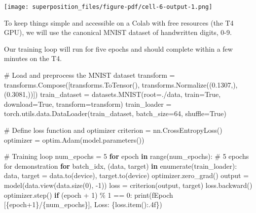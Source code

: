 \documentclass[
  letterpaper,
  DIV=11,
  numbers=noendperiod]{scrreprt}
\newenvironment{Shaded}{\begin{snugshade}}{\end{snugshade}}
\newcommand{\BuiltInTok}[1]{\textcolor[rgb]{0.00,0.23,0.31}{#1}}
\newcommand{\CommentTok}[1]{\textcolor[rgb]{0.37,0.37,0.37}{#1}}
\newcommand{\ControlFlowTok}[1]{\textcolor[rgb]{0.00,0.23,0.31}{\textbf{#1}}}
\newcommand{\DecValTok}[1]{\textcolor[rgb]{0.68,0.00,0.00}{#1}}
\newcommand{\FloatTok}[1]{\textcolor[rgb]{0.68,0.00,0.00}{#1}}
\newcommand{\KeywordTok}[1]{\textcolor[rgb]{0.00,0.23,0.31}{\textbf{#1}}}
\newcommand{\NormalTok}[1]{\textcolor[rgb]{0.00,0.23,0.31}{#1}}
\newcommand{\OperatorTok}[1]{\textcolor[rgb]{0.37,0.37,0.37}{#1}}
\newcommand{\SpecialCharTok}[1]{\textcolor[rgb]{0.37,0.37,0.37}{#1}}
\newcommand{\SpecialStringTok}[1]{\textcolor[rgb]{0.13,0.47,0.30}{#1}}
\newcommand{\StringTok}[1]{\textcolor[rgb]{0.13,0.47,0.30}{#1}}
\newcommand{\VariableTok}[1]{\textcolor[rgb]{0.07,0.07,0.07}{#1}}
\begin{document}
\texttt{[image: superposition\_files/figure-pdf/cell-6-output-1.png]}

To keep things simple and accessible on a Colab with free resources (the
T4 GPU), we will use the canonical MNIST dataset of handwritten digits,
0-9.

Our training loop will run for five epochs and should complete within a
few minutes on the T4.

\begin{Shaded}
\begin{Highlighting}[]
\CommentTok{\# Load and preprocess the MNIST dataset}
\NormalTok{transform }\OperatorTok{=}\NormalTok{ transforms.Compose([transforms.ToTensor(), transforms.Normalize((}\FloatTok{0.1307}\NormalTok{,), (}\FloatTok{0.3081}\NormalTok{,))])}
\NormalTok{train\_dataset }\OperatorTok{=}\NormalTok{ datasets.MNIST(root}\OperatorTok{=}\StringTok{\textquotesingle{}./data\textquotesingle{}}\NormalTok{, train}\OperatorTok{=}\VariableTok{True}\NormalTok{, download}\OperatorTok{=}\VariableTok{True}\NormalTok{, transform}\OperatorTok{=}\NormalTok{transform)}
\NormalTok{train\_loader }\OperatorTok{=}\NormalTok{ torch.utils.data.DataLoader(train\_dataset, batch\_size}\OperatorTok{=}\DecValTok{64}\NormalTok{, shuffle}\OperatorTok{=}\VariableTok{True}\NormalTok{)}

\CommentTok{\# Define loss function and optimizer}
\NormalTok{criterion }\OperatorTok{=}\NormalTok{ nn.CrossEntropyLoss()}
\NormalTok{optimizer }\OperatorTok{=}\NormalTok{ optim.Adam(model.parameters())}

\CommentTok{\# Training loop}
\NormalTok{num\_epochs }\OperatorTok{=} \DecValTok{5}
\ControlFlowTok{for}\NormalTok{ epoch }\KeywordTok{in} \BuiltInTok{range}\NormalTok{(num\_epochs):  }\CommentTok{\# 5 epochs for demonstration}
    \ControlFlowTok{for}\NormalTok{ batch\_idx, (data, target) }\KeywordTok{in} \BuiltInTok{enumerate}\NormalTok{(train\_loader):}
\NormalTok{        data, target }\OperatorTok{=}\NormalTok{ data.to(device), target.to(device)}
\NormalTok{        optimizer.zero\_grad()}
\NormalTok{        output }\OperatorTok{=}\NormalTok{ model(data.view(data.size(}\DecValTok{0}\NormalTok{), }\OperatorTok{{-}}\DecValTok{1}\NormalTok{))}
\NormalTok{        loss }\OperatorTok{=}\NormalTok{ criterion(output, target)}
\NormalTok{        loss.backward()}
\NormalTok{        optimizer.step()}
    \ControlFlowTok{if}\NormalTok{ (epoch }\OperatorTok{+} \DecValTok{1}\NormalTok{) }\OperatorTok{\%} \DecValTok{1} \OperatorTok{==} \DecValTok{0}\NormalTok{:}
            \BuiltInTok{print}\NormalTok{(}\SpecialStringTok{f\textquotesingle{}Epoch [}\SpecialCharTok{\{}\NormalTok{epoch}\OperatorTok{+}\DecValTok{1}\SpecialCharTok{\}}\SpecialStringTok{/}\SpecialCharTok{\{}\NormalTok{num\_epochs}\SpecialCharTok{\}}\SpecialStringTok{], Loss: }\SpecialCharTok{\{}\NormalTok{loss}\SpecialCharTok{.}\NormalTok{item()}\SpecialCharTok{:.4f\}}\SpecialStringTok{\textquotesingle{}}\NormalTok{)}
\end{Highlighting}
\end{Shaded}
\end{document}
